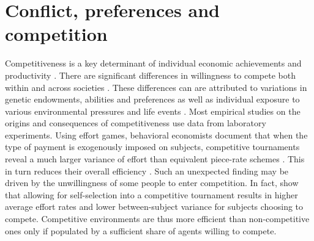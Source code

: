 \section{Conflict, preferences and competition}
\label{sec:slfootball:litreview}
Competitiveness is a key determinant of individual economic achievements and productivity \citep{Niederle2007}. There are significant differences in willingness to compete both within and across societies \citep{Leibbrandt2013}. These differences can are attributed to variations in genetic endowments, abilities and preferences \citep{Niederle2007,Gneezy2009} as well as individual exposure to various environmental pressures and life events \citep{Roth1995}. Most empirical studies on the origins and consequences of competitiveness use data from laboratory experiments. Using effort games, behavioral economists document that when the type of payment is exogenously imposed on subjects, competitive tournaments reveal a much larger variance of effort than equivalent piece-rate schemes \citep{Dijk2001,Harbring2003a}. This in turn reduces their overall efficiency \citep{Eriksson2009a}. Such an unexpected finding may be driven by the unwillingness of some people to enter competition. In fact, \cite{Eriksson2009a} show that allowing for self-selection into a competitive tournament results in higher average effort rates and lower between-subject variance for subjects choosing to compete. Competitive environments are thus more efficient than non-competitive ones only if populated by a sufficient share of agents willing to compete.

